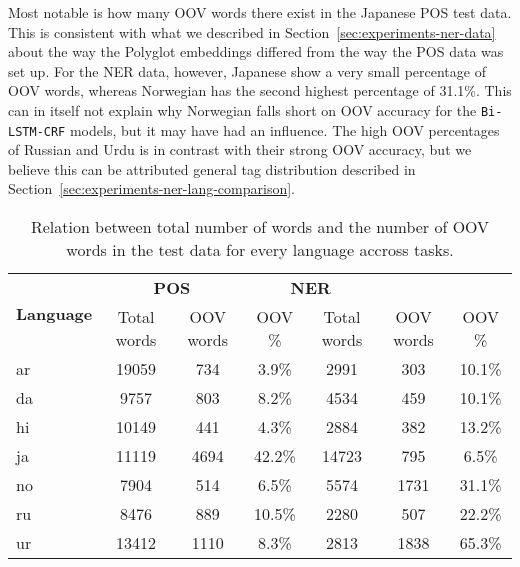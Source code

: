 Most notable is how many OOV words there exist in the Japanese POS test data.
This is consistent with what we described in
Section~\ref{sec:experiments-ner-data} about the way the Polyglot embeddings
differed from the way the POS data was set up. For the NER data, however,
Japanese show a very small percentage of OOV words, whereas Norwegian has
the second highest percentage of 31.1\%. This can in itself not explain why
Norwegian falls short on OOV accuracy for the \texttt{Bi-LSTM-CRF} models, but
it may have had an influence. The high OOV percentages of Russian and Urdu is in
contrast with their strong OOV accuracy, but we believe this can be attributed
general tag distribution described in
Section~\ref{sec:experiments-ner-lang-comparison}.

\begin{table}[h!]
    \centering
    \begin{tabular}{l c c c|c c c}
        \toprule
        \multirow{2}{*}{\bfseries Language} &
        \multicolumn{2}{c}{\bfseries POS} &
        \multicolumn{2}{c}{\bfseries NER} \\

        \cmidrule(lr){2-7}
        & Total words & OOV words & OOV \%
        & Total words & OOV words & OOV \% \\

        \cmidrule(lr){1-7}
        ar & 19059 &  734 &  3.9\% &  2991 &  303 & 10.1\% \\
        da &  9757 &  803 &  8.2\% &  4534 &  459 & 10.1\% \\
        hi & 10149 &  441 &  4.3\% &  2884 &  382 & 13.2\% \\
        ja & 11119 & 4694 & 42.2\% & 14723 &  795 &  6.5\% \\
        no &  7904 &  514 &  6.5\% &  5574 & 1731 & 31.1\% \\
        ru &  8476 &  889 & 10.5\% &  2280 &  507 & 22.2\% \\
        ur & 13412 & 1110 &  8.3\% &  2813 & 1838 & 65.3\% \\

        \bottomrule
    \end{tabular}
    \caption{Relation between total number of words and the number of OOV words
        in the test data for every language accross tasks.
    }\label{table:oov-percentages-total}
\end{table}


\pagebreak
